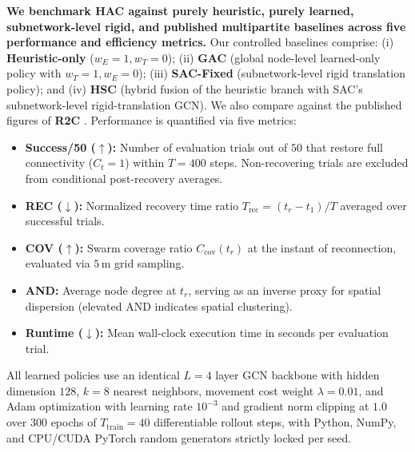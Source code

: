 \documentclass[11pt]{article}
\theoremstyle{plain}
\theoremstyle{definition}
\theoremstyle{remark}
\begin{document}
\textbf{We benchmark HAC against purely heuristic, purely learned, subnetwork-level rigid, and published multipartite baselines across five performance and efficiency metrics.} Our controlled baselines comprise: (i) \textbf{Heuristic-only} ($w_E=1, w_T=0$); (ii) \textbf{GAC} (global node-level learned-only policy with $w_T=1, w_E=0$); (iii) \textbf{SAC-Fixed} (subnetwork-level rigid translation policy); and (iv) \textbf{HSC} (hybrid fusion of the heuristic branch with SAC's subnetwork-level rigid-translation GCN). We also compare against the published figures of \textbf{R2C} \citep{peng2026r2c}. Performance is quantified via five metrics:
\begin{itemize}[nosep]
  \item \textbf{Success/50 ($\uparrow$):} Number of evaluation trials out of $50$ that restore full connectivity ($C_t = 1$) within $T = 400$ steps. Non-recovering trials are excluded from conditional post-recovery averages.
  \item \textbf{REC ($\downarrow$):} Normalized recovery time ratio $T_{\mathrm{rec}} = (t_r - t_1)/T$ averaged over successful trials.
  \item \textbf{COV ($\uparrow$):} Swarm coverage ratio $C_{\mathrm{cov}}(t_r)$ at the instant of reconnection, evaluated via $5\,\mathrm{m}$ grid sampling.
  \item \textbf{AND:} Average node degree at $t_r$, serving as an inverse proxy for spatial dispersion (elevated AND indicates spatial clustering).
  \item \textbf{Runtime ($\downarrow$):} Mean wall-clock execution time in seconds per evaluation trial.
\end{itemize}
All learned policies use an identical $L=4$ layer GCN backbone with hidden dimension $128$, $k=8$ nearest neighbors, movement cost weight $\lambda = 0.01$, and Adam optimization with learning rate $10^{-3}$ and gradient norm clipping at $1.0$ over $300$ epochs of $T_{\mathrm{train}} = 40$ differentiable rollout steps, with Python, NumPy, and CPU/CUDA PyTorch random generators strictly locked per seed.
\end{document}
